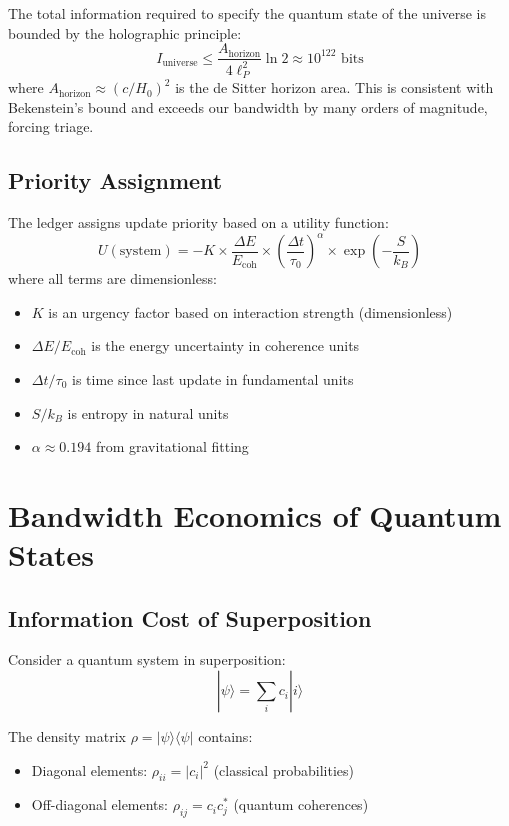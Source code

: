 \documentclass[twocolumn,prd,amsmath,amssymb,aps,superscriptaddress,nofootinbib]{revtex4-2}
\begin{document}
The total information required to specify the quantum state of the universe is bounded by the holographic principle:
\begin{equation}
I_{\text{universe}} \leq \frac{A_{\text{horizon}}}{4\ell_P^2} \ln 2 \approx 10^{122} \text{ bits}
\end{equation}
where $A_{\text{horizon}} \approx (c/H_0)^2$ is the de Sitter horizon area. This is consistent with Bekenstein's bound and exceeds our bandwidth by many orders of magnitude, forcing triage.

\subsection{Priority Assignment}

The ledger assigns update priority based on a utility function:
\begin{equation}
U(\text{system}) = -K \times \frac{\Delta E}{E_{\text{coh}}} \times \left(\frac{\Delta t}{\tau_0}\right)^\alpha \times \exp\left(-\frac{S}{k_B}\right)
\label{eq:utility}
\end{equation}
where all terms are dimensionless:
\begin{itemize}
\item $K$ is an urgency factor based on interaction strength (dimensionless)
\item $\Delta E/E_{\text{coh}}$ is the energy uncertainty in coherence units
\item $\Delta t/\tau_0$ is time since last update in fundamental units
\item $S/k_B$ is entropy in natural units
\item $\alpha \approx 0.194$ from gravitational fitting
\end{itemize}

\section{Bandwidth Economics of Quantum States}
\label{sec:bandwidth}

\subsection{Information Cost of Superposition}

Consider a quantum system in superposition:
\begin{equation}
|\psi\rangle = \sum_i c_i |i\rangle
\end{equation}

The density matrix $\rho = |\psi\rangle\langle\psi|$ contains:
\begin{itemize}
\item Diagonal elements: $\rho_{ii} = |c_i|^2$ (classical probabilities)
\item Off-diagonal elements: $\rho_{ij} = c_i c_j^*$ (quantum coherences)
\end{itemize}
\end{document}
